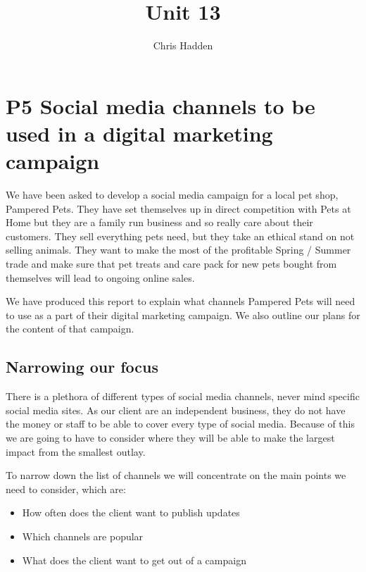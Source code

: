 \documentclass{article}
\begin{document}
\title{Unit 13}
\author{Chris Hadden}
\date{}
\maketitle

\section{P5 Social media channels to be used in a digital marketing campaign}

We have been asked to develop a social media campaign for a local pet shop, Pampered Pets.
They have set themselves up in direct competition with Pets at Home but they are a family run business and so really care about their customers. 
They sell everything pets need, but they take an ethical stand on not selling animals. 
They want to make the most of the profitable Spring / Summer trade and make sure that pet treats and care pack for new pets bought from themselves will lead to ongoing online sales.

We have produced this report to explain what channels Pampered Pets will need to use as a part of their digital marketing campaign.
We also outline our plans for the content of that campaign.

\bigskip

\subsection{Narrowing our focus}
There is a plethora of different types of social media channels, never mind specific social media sites.
As our client are an independent business, they do not have the money or staff to be able to cover every type of social media. Because of this we are going to have to consider where they will be able to make the largest impact from the smallest outlay.

To narrow down the list of channels we will concentrate on the main points we need to consider, which are:
\begin{itemize}
    \item How often does the client want to publish updates
    \item Which channels are popular
    \item What does the client want to get out of a campaign
\end{itemize}

\newpage
\end{document}
